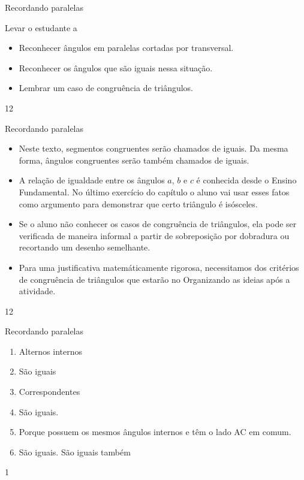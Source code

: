 \begin{objectives}{Recordando paralelas}
{
Levar o estudante a
\begin{itemize}
\item {} 
Reconhecer ângulos em paralelas cortadas por transversal.

\item {} 
Reconhecer os ângulos que são iguais nessa situação.

\item {} 
Lembrar um caso de congruência de triângulos.

\end{itemize}
}{1}{2}
\end{objectives}
\begin{sugestions}{Recordando paralelas}
{
\begin{itemize}
\item {} 
Neste texto, segmentos congruentes serão chamados de iguais. Da mesma forma, ângulos congruentes serão também chamados de iguais.

\item {} 
A relação de igualdade entre os ângulos \(a\), \(b\) e \(c\) é conhecida desde o Ensino Fundamental. No último exercício do capítulo o aluno vai usar esses fatos como argumento para demonstrar que certo triângulo é isósceles.

\item {} 
Se o aluno não conhecer os casos de congruência de triângulos, ela pode ser verificada de maneira informal a partir de sobreposição por dobradura ou recortando um desenho semelhante.

\item {} 
Para uma justificativa matemáticamente rigorosa, necessitamos dos critérios de congruência de triângulos que estarão no Organizando as ideias após a atividade.

\end{itemize}
}{1}{2}
\end{sugestions}
\begin{answer}{Recordando paralelas}
{
\begin{enumerate}
\item {} 
Alternos internos

\item {} 
São iguais

\item {} 
Correspondentes

\item {} 
São iguais.

\item {} 
Porque possuem os mesmos ângulos internos e têm o lado AC em comum.

\item {} 
São iguais. São iguais também

\end{enumerate}
}{1}
\end{answer}




